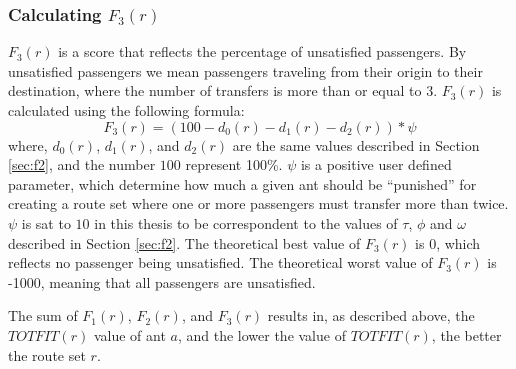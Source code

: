 \subsubsection{Calculating $F_{3}(r)$}
\label{sec:f3}
$F_3(r)$ is a score that reflects the percentage of unsatisfied passengers. By unsatisfied passengers we mean passengers traveling from their origin to their destination, where the number of transfers is more than or equal to 3. $F_3(r)$ is calculated using the following formula:
\newline
$$F_3(r) = (100 - d_0(r) - d_1(r) - d_2(r))*\psi$$
\newline
where, $d_0(r)$, $d_1(r)$, and $d_2(r)$ are the same values described in Section \vref{sec:f2}, and the number $100$ represent 100\%. $\psi$ is a positive user defined parameter, which determine how much a given ant should be ``punished'' for creating a route set where one or more passengers must transfer more than twice. $\psi$ is sat to $10$ in this thesis to be correspondent to the values of $\tau$, $\phi$ and $\omega$ described in Section \vref{sec:f2}. The theoretical best value of $F_3(r)$ is 0, which reflects no passenger being unsatisfied. The theoretical worst value of $F_3(r)$ is -1000, meaning that all passengers are unsatisfied.


The sum of $F_{1}(r)$, $F_{2}(r)$, and $F_{3}(r)$ results in, as described above, the $TOTFIT(r)$ value of ant $a$, and the lower the value of $TOTFIT(r)$, the better the route set $r$. 

